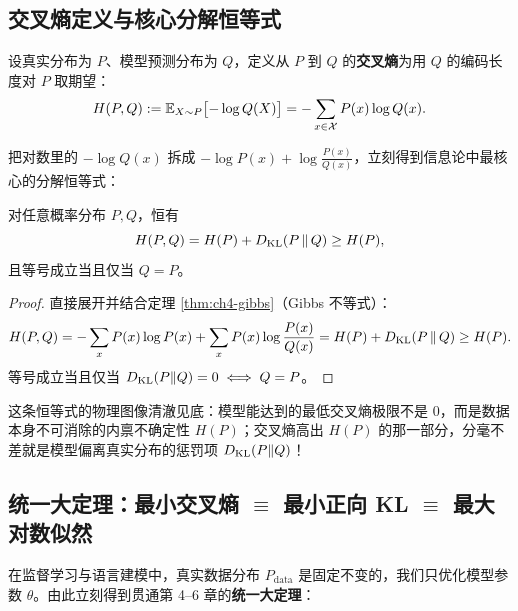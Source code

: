 \subsection{交叉熵定义与核心分解恒等式}

\begin{defBox}
\begin{definition}
\label{def:ch4-ce}
设真实分布为 $P$、模型预测分布为 $Q$，定义从 $P$ 到 $Q$ 的\textbf{交叉熵}为用 $Q$ 的编码长度对 $P$ 取期望：
\begin{equation}
  H(P, Q) := \mathbb{E}_{X \sim P}\bigl[-\log Q(X)\bigr] = -\sum_{x \in \mathcal{X}} P(x)\log Q(x). \label{eq:ch4-ce}
\end{equation}
\end{definition}
\end{defBox}

把对数里的 $-\log Q(x)$ 拆成 $-\log P(x) + \log\frac{P(x)}{Q(x)}$，立刻得到信息论中最核心的分解恒等式：

\begin{proposition}[交叉熵 = 真实熵 + KL 散度]
\label{prop:ch4-ce-kl}
对任意概率分布 $P, Q$，恒有
\begin{equation}
  H(P, Q) = H(P) + D_{\mathrm{KL}}(P \,\|\, Q) \ge H(P), \label{eq:ch4-ce-kl}
\end{equation}
且等号成立当且仅当 $Q = P$。
\end{proposition}

\begin{proof}
直接展开并结合定理 \ref{thm:ch4-gibbs}（Gibbs 不等式）：
\[
  H(P, Q)
  = -\sum_x P(x)\log P(x) + \sum_x P(x)\log\frac{P(x)}{Q(x)}
  = H(P) + D_{\mathrm{KL}}(P \,\|\, Q)
  \ge H(P).
\]
等号成立当且仅当 $D_{\mathrm{KL}}(P\|Q) = 0 \iff Q = P$。
\end{proof}

这条恒等式的物理图像清澈见底：模型能达到的最低交叉熵极限不是 $0$，而是数据本身不可消除的内禀不确定性 $H(P)$；交叉熵高出 $H(P)$ 的那一部分，分毫不差就是模型偏离真实分布的惩罚项 $D_{\mathrm{KL}}(P\|Q)$！

\subsection{统一大定理：最小交叉熵 $\equiv$ 最小正向 KL $\equiv$ 最大对数似然}

在监督学习与语言建模中，真实数据分布 $P_{\mathrm{data}}$ 是固定不变的，我们只优化模型参数 $\theta$。由此立刻得到贯通第 4--6 章的\textbf{统一大定理}：

